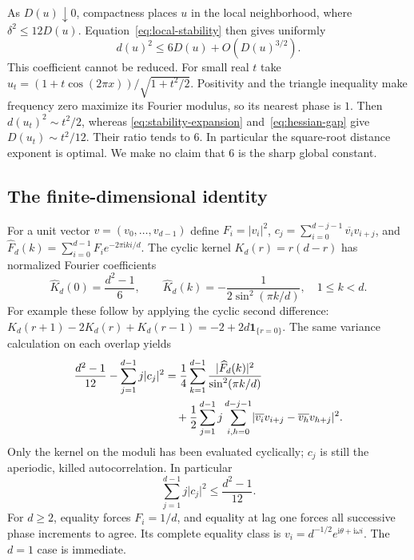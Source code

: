 \documentclass[11pt,reqno]{amsart}
\numberwithin{equation}{section}
\newcommand{\ii}{\mathrm i}
\newcommand{\one}{\mathbf 1}
\newcommand{\abs}[1]{\lvert#1\rvert}
\begin{document}
As $D(u)\downarrow0$, compactness places $u$ in the local
neighborhood, where $\delta^2\le12D(u)$.
Equation~\eqref{eq:local-stability} then gives uniformly
\begin{equation}\label{eq:sharp-stability}
 d(u)^2\le6D(u)+O(D(u)^{3/2}).
\end{equation}
This coefficient cannot be reduced. For small real $t$ take
$u_t=(1+t\cos(2\pi x))/\sqrt{1+t^2/2}$.
Positivity and the triangle inequality make frequency zero
maximize its Fourier modulus, so its nearest phase is $1$.
Then $d(u_t)^2\sim t^2/2$, whereas
\eqref{eq:stability-expansion} and~\eqref{eq:hessian-gap} give
$D(u_t)\sim t^2/12$. Their ratio tends to $6$. In particular
the square-root distance exponent is optimal. We make no
claim that $6$ is the sharp global constant.

\subsection*{The finite-dimensional identity}

For a unit vector $v=(v_0,\ldots,v_{d-1})$ define
$F_i=\abs{v_i}^2$,
$c_j=\sum_{i=0}^{d-j-1}\overline{v_i}v_{i+j}$, and
$\widehat F_d(k)=\sum_{i=0}^{d-1}F_i e^{-2\pi\ii ki/d}$.
The cyclic kernel $K_d(r)=r(d-r)$ has normalized Fourier coefficients
\[
 \widehat K_d(0)=\frac{d^2-1}{6},\qquad
 \widehat K_d(k)=-\frac1{2\sin^2(\pi k/d)},\quad 1\le k<d.
\]
For example these follow by applying the cyclic second difference:
$K_d(r+1)-2K_d(r)+K_d(r-1)=-2+2d\one_{\{r=0\}}$.
The same variance calculation on each overlap yields
\begin{align}\label{eq:discrete-deficit}
 \frac{d^2-1}{12}-\sum_{j=1}^{d-1}j\abs{c_j}^2
 &=\frac14\sum_{k=1}^{d-1}
       \frac{\abs{\widehat F_d(k)}^2}{\sin^2(\pi k/d)}\notag\\
 &\quad+\frac12\sum_{j=1}^{d-1}j
       \sum_{i,h=0}^{d-j-1}
       \abs{\overline{v_i}v_{i+j}-\overline{v_h}v_{h+j}}^2.
\end{align}
Only the kernel on the moduli has been evaluated cyclically;
$c_j$ is still the aperiodic, killed autocorrelation. In particular
\begin{equation}\label{eq:discrete-bound}
 \sum_{j=1}^{d-1}j\abs{c_j}^2\le\frac{d^2-1}{12}.
\end{equation}
For $d\ge2$, equality forces $F_i=1/d$, and equality at lag one
forces all successive phase increments to agree. Its complete equality class
is $v_i=d^{-1/2}e^{\ii\theta+\ii\omega i}$. The $d=1$ case is
immediate.
\end{document}
